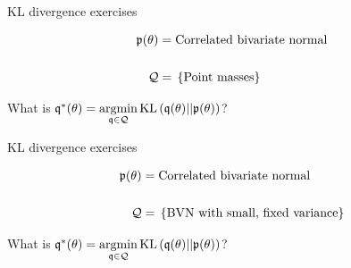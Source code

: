 \begin{frame}{KL divergence exercises}
\hspace{-3em}
\begin{minipage}{0.5\textwidth}
%
\begin{align*}
%
\p(\theta) ={}& \textrm{Correlated bivariate normal}\\ \\
\qdom ={}& \left\{ \textrm{Point masses}\right\}
%
\end{align*}

What is $\mathfrak{q}^*(\theta) ={} \underset{\mathfrak{q} \in \mathcal{Q}}{\mathrm{argmin}}\, \mathrm{KL}\left(\mathfrak{q}(\theta) || \mathfrak{p}(\theta) \right)$?
%
\end{minipage}
%
\begin{minipage}{0.4\textwidth}

\end{minipage}

\end{frame}





\begin{frame}{KL divergence exercises}
\hspace{-3em}
\begin{minipage}{0.5\textwidth}
%
\begin{align*}
%
\p(\theta) ={}& \textrm{Correlated bivariate normal}\\ \\
\qdom ={}& \left\{ \textrm{BVN with small, fixed variance}\right\}
%
\end{align*}

What is $\mathfrak{q}^*(\theta) ={} \underset{\mathfrak{q} \in \mathcal{Q}}{\mathrm{argmin}}\, \mathrm{KL}\left(\mathfrak{q}(\theta) || \mathfrak{p}(\theta) \right)$?
%
\end{minipage}
%
\begin{minipage}{0.4\textwidth}

\end{minipage}

\end{frame}
